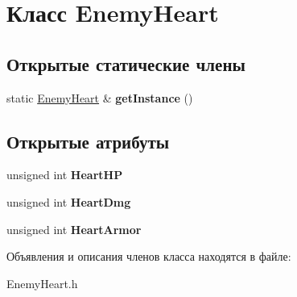 \hypertarget{classEnemyHeart}{}\section{Класс Enemy\+Heart}
\label{classEnemyHeart}
\subsection*{Открытые статические члены}
\begin{DoxyCompactItemize}
\item 
static \hyperlink{classEnemyHeart}{Enemy\+Heart} \& {\bfseries get\+Instance} ()\hypertarget{classEnemyHeart_a21f2f4e84f79d44353c2035359ce95e5}{}\label{classEnemyHeart_a21f2f4e84f79d44353c2035359ce95e5}

\end{DoxyCompactItemize}
\subsection*{Открытые атрибуты}
\begin{DoxyCompactItemize}
\item 
unsigned int {\bfseries Heart\+HP}\hypertarget{classEnemyHeart_a5543da4eac2551deab339154f5ed21b4}{}\label{classEnemyHeart_a5543da4eac2551deab339154f5ed21b4}

\item 
unsigned int {\bfseries Heart\+Dmg}\hypertarget{classEnemyHeart_a0dc58bbd100ba75ea69723a55b169bef}{}\label{classEnemyHeart_a0dc58bbd100ba75ea69723a55b169bef}

\item 
unsigned int {\bfseries Heart\+Armor}\hypertarget{classEnemyHeart_abbcd8f0b86dbd3b430ccc66f613f01ca}{}\label{classEnemyHeart_abbcd8f0b86dbd3b430ccc66f613f01ca}

\end{DoxyCompactItemize}


Объявления и описания членов класса находятся в файле\+:\begin{DoxyCompactItemize}
\item 
Enemy\+Heart.\+h\end{DoxyCompactItemize}
